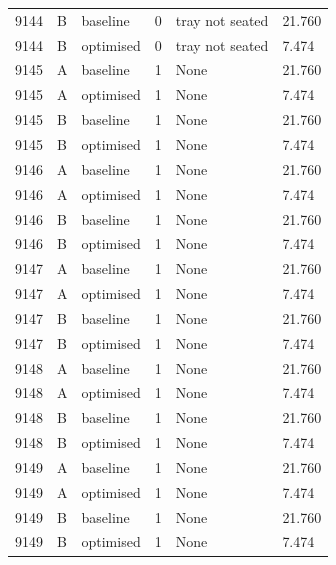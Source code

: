 \begin{longtable}{llllll}
9144 & B & baseline & 0 & tray not seated & 21.760 \\
9144 & B & optimised & 0 & tray not seated & 7.474 \\
9145 & A & baseline & 1 & None & 21.760 \\
9145 & A & optimised & 1 & None & 7.474 \\
9145 & B & baseline & 1 & None & 21.760 \\
9145 & B & optimised & 1 & None & 7.474 \\
9146 & A & baseline & 1 & None & 21.760 \\
9146 & A & optimised & 1 & None & 7.474 \\
9146 & B & baseline & 1 & None & 21.760 \\
9146 & B & optimised & 1 & None & 7.474 \\
9147 & A & baseline & 1 & None & 21.760 \\
9147 & A & optimised & 1 & None & 7.474 \\
9147 & B & baseline & 1 & None & 21.760 \\
9147 & B & optimised & 1 & None & 7.474 \\
9148 & A & baseline & 1 & None & 21.760 \\
9148 & A & optimised & 1 & None & 7.474 \\
9148 & B & baseline & 1 & None & 21.760 \\
9148 & B & optimised & 1 & None & 7.474 \\
9149 & A & baseline & 1 & None & 21.760 \\
9149 & A & optimised & 1 & None & 7.474 \\
9149 & B & baseline & 1 & None & 21.760 \\
9149 & B & optimised & 1 & None & 7.474 \\
\bottomrule
\end{longtable}
